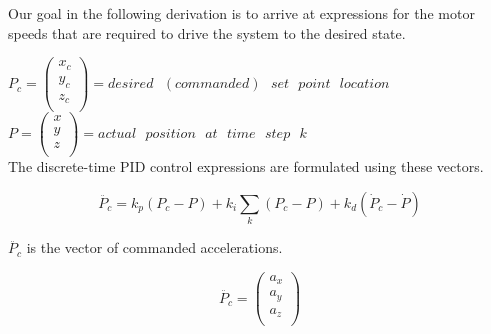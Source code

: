Our goal in the following derivation is to arrive at expressions for the motor speeds that are required to drive the system to the desired state. 


$P_c = \left( \begin{array}{c}
x_c\\y_c\\z_c\\
\end{array}\right) = desired\text{ } (commanded)\text{ }set\text{ }point\text{ }location $\\

$P = \left( \begin{array}{c}
x\\y\\z\\
\end{array}\right) = actual \text{ }position\text{ }at\text{ }time\text{ }step\text{ }k$\\

The discrete-time PID control expressions are formulated using these vectors.

\begin{equation}
    \label{eq:acc_comm}
    \ddot{P_c} = k_p(P_c - P) + k_i \sum_k (P_c-P) + k_d(\dot{P}_c - \dot{P})  
\end{equation}






$\ddot{P_c}$ is the vector of commanded accelerations.

\begin{equation}
    \ddot{P_c} = \left( \begin{array}{c}
    a_x\\a_y\\a_z\\
    \end{array}\right)
\end{equation}

